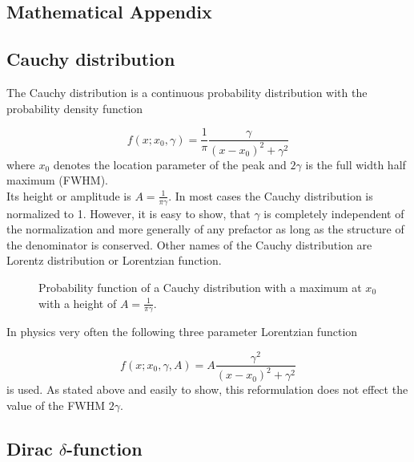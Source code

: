 \begin{appendix}

\chapter{Mathematical Appendix}
\section{Cauchy distribution} \label{section:app_cauchy}
The Cauchy distribution is a continuous probability distribution
with the probability density function

\begin{equation}
  f(x;x_0,\gamma) = \frac 1\pi \frac{\gamma}{(x-x_0)^2 + \gamma^2}
\end{equation}
where $x_0$ denotes the location parameter of the peak and
$2 \gamma$ is the full width half maximum (FWHM).\\
Its height or amplitude is $A = \frac{1}{\pi\gamma}$.
In most cases the
Cauchy distribution is normalized to 1. However, it is easy to show,
that $\gamma$ is completely
independent of the normalization and more generally of any prefactor
as long as the structure of the denominator is conserved.
Other names of the Cauchy distribution are Lorentz distribution or
Lorentzian function.


\begin{figure}[h]
  \centering
  
  \caption{Probability function of a Cauchy distribution with a
           maximum at $x_0$ with a height of $A=\frac{1}{\pi\gamma}$.}
  \label{figure:cauchy_distribution}
\end{figure}


In physics very often the following three parameter Lorentzian function

\begin{equation}
  f(x;x_0,\gamma,A) = A \frac{\gamma^2}{(x-x_0)^2 + \gamma^2}
\end{equation}
is used. As stated above and easily to show, this reformulation does
not effect the value of the FWHM $2 \gamma$.


\section{Dirac $\delta$-function}

\end{appendix}
